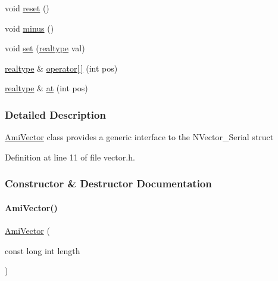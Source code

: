 \begin{DoxyCompactItemize}
\item 
void \mbox{\hyperlink{classamici_1_1_ami_vector_ad20897c5c8bd47f5d4005989bead0e55}{reset}} ()
\item 
void \mbox{\hyperlink{classamici_1_1_ami_vector_a19ad39a609bfc430ed6f7992e841b024}{minus}} ()
\item 
void \mbox{\hyperlink{classamici_1_1_ami_vector_a11418c829db7c2891d63491cf12d29b4}{set}} (\mbox{\hyperlink{namespaceamici_a1bdce28051d6a53868f7ccbf5f2c14a3}{realtype}} val)
\item 
\mbox{\hyperlink{namespaceamici_a1bdce28051d6a53868f7ccbf5f2c14a3}{realtype}} \& \mbox{\hyperlink{classamici_1_1_ami_vector_a3cea12a1bf8945da7c2d39b9ee526ed2}{operator\mbox{[}$\,$\mbox{]}}} (int pos)
\item 
\mbox{\hyperlink{namespaceamici_a1bdce28051d6a53868f7ccbf5f2c14a3}{realtype}} \& \mbox{\hyperlink{classamici_1_1_ami_vector_ae62cf934983479ccb255785bdf455a2c}{at}} (int pos)
\end{DoxyCompactItemize}


\subsubsection{Detailed Description}
\mbox{\hyperlink{classamici_1_1_ami_vector}{Ami\+Vector}} class provides a generic interface to the N\+Vector\+\_\+\+Serial struct 

Definition at line 11 of file vector.\+h.



\subsubsection{Constructor \& Destructor Documentation}
\mbox{\label{classamici_1_1_ami_vector_a843c8e8dfc2642218e9f42d86d42c28c}} 
\paragraph{\texorpdfstring{Ami\+Vector()}{AmiVector()}\hspace{0.1cm}{\footnotesize\ttfamily [1/3]}}
{\footnotesize\ttfamily \mbox{\hyperlink{classamici_1_1_ami_vector}{Ami\+Vector}} (\begin{DoxyParamCaption}\item[{const long int}]{length }\end{DoxyParamCaption})}

